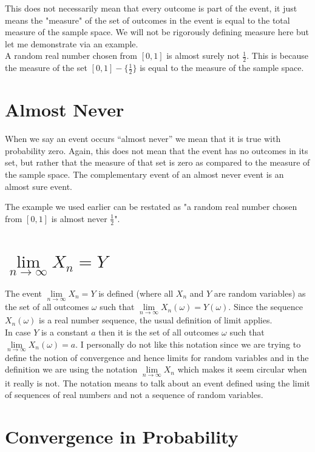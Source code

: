 \noindent This does not necessarily mean that every outcome is part of the event, it just means 
the "measure" of the set of outcomes in the event is equal to the total measure of the 
sample space. We will not be rigorously defining measure here but let me demonstrate via an example.\\


\noindent A random real number chosen from $[0,1]$ is almost surely not $\frac{1}{2}$. This is because the 
measure of the set $[0,1]-\{\frac{1}{2}\}$ is equal to the measure of the sample space. 

\section{Almost Never}
When we say an event occurs ``almost never'' we mean that it is true with probability zero. Again, 
this does not mean that the event has no outcomes in its set, but rather that the measure of that set is 
zero as compared to the measure of the sample space. The complementary event of an almost never event is an 
almost sure event.

The example we used earlier can be restated as "a random real number chosen from $[0,1]$ is 
almost never $\frac{1}{2}$".

\section{$\lim\limits_{n\to\infty}X_n=Y$}
The event $\lim\limits_{n\to\infty}X_n=Y$ is defined (where all $X_n$ and $Y$ are random variables) as 
the set of all outcomes $\omega$ such that $\lim\limits_{n\to\infty} X_n(\omega)=Y(\omega)$. Since 
the sequence $X_n(\omega)$ is a real number sequence, the usual definition of limit applies.\\


\noindent In case $Y$ is a constant $a$ then it is the set of all outcomes $\omega$ 
such that $\lim\limits_{n\to\infty} X_n(\omega)=a$. I personally do not like this notation since 
we are trying to define the notion of convergence and hence limits for random variables and in the definition 
we are using the notation $\lim\limits_{n\to\infty} X_n$ which makes it seem circular when it really is not. The 
notation means to talk about an event defined using the limit of sequences of real numbers 
and not a sequence of random variables.

\section{Convergence in Probability}

